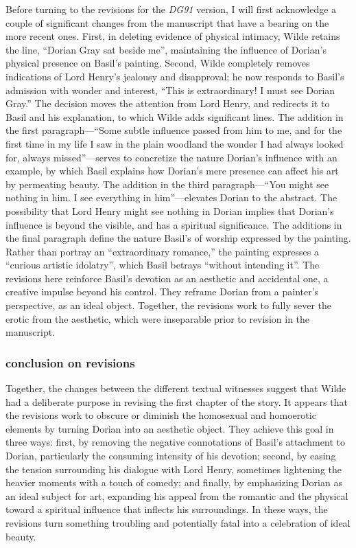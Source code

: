 \documentclass[11pt]{article}
\begin{document}
Before turning to the revisions for the \emph{DG91} version, I will first
acknowledge a couple of significant changes from the manuscript that
have a bearing on the more recent ones. First, in deleting evidence of
physical intimacy, Wilde retains the line, “Dorian Gray sat beside
me”, maintaining the influence of Dorian’s physical presence on
Basil’s painting. Second, Wilde completely removes indications of Lord
Henry’s jealousy and disapproval; he now responds to Basil’s admission
with wonder and interest, “This is extraordinary! I must see Dorian
Gray.” The decision moves the attention from Lord Henry, and redirects
it to Basil and his explanation, to which Wilde adds significant
lines. The addition in the first paragraph—“Some subtle influence
passed from him to me, and for the first time in my life I saw in the
plain woodland the wonder I had always looked for, always
missed”—serves to concretize the nature Dorian’s influence with an
example, by which Basil explains how Dorian’s mere presence can affect
his art by permeating beauty. The addition in the third paragraph—“You
might see nothing in him. I see everything in him”—elevates Dorian to
the abstract. The possibility that Lord Henry might see nothing in
Dorian implies that Dorian’s influence is beyond the visible, and has
a spiritual significance. The additions in the final paragraph define
the nature Basil’s of worship expressed by the painting. Rather than
portray an “extraordinary romance,” the painting expresses a “curious
artistic idolatry”, which Basil betrays “without intending it”. The
revisions here reinforce Basil’s devotion as an aesthetic and
accidental one, a creative impulse beyond his control. They reframe
Dorian from a painter’s perspective, as an ideal object. Together, the
revisions work to fully sever the erotic from the aesthetic, which
were inseparable prior to revision in the manuscript.



\subsubsection{conclusion on revisions}
\label{sec:org222f84c}
Together, the changes between the different textual witnesses suggest that Wilde had a deliberate purpose in revising the first chapter of the story. It appears that the revisions work to obscure or diminish the homosexual and homoerotic elements by turning Dorian into an aesthetic object. They achieve this goal in three ways: first, by removing the negative connotations of Basil’s attachment to Dorian, particularly the consuming intensity of his devotion; second, by easing the tension surrounding his dialogue with Lord Henry, sometimes lightening the heavier moments with a touch of comedy; and finally, by emphasizing Dorian as an ideal subject for art, expanding his appeal from the romantic and the physical toward a spiritual influence that inflects his surroundings. In these ways, the revisions turn something troubling and potentially fatal into a celebration of ideal beauty.
\end{document}
